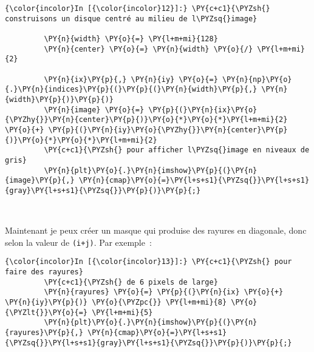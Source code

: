     \begin{Verbatim}[commandchars=\\\{\}]
{\color{incolor}In [{\color{incolor}12}]:} \PY{c+c1}{\PYZsh{} construisons un disque centré au milieu de l\PYZsq{}image}
         
         \PY{n}{width} \PY{o}{=} \PY{l+m+mi}{128}
         \PY{n}{center} \PY{o}{=} \PY{n}{width} \PY{o}{/} \PY{l+m+mi}{2}
         
         \PY{n}{ix}\PY{p}{,} \PY{n}{iy} \PY{o}{=} \PY{n}{np}\PY{o}{.}\PY{n}{indices}\PY{p}{(}\PY{p}{(}\PY{n}{width}\PY{p}{,} \PY{n}{width}\PY{p}{)}\PY{p}{)}
         \PY{n}{image} \PY{o}{=} \PY{p}{(}\PY{n}{ix}\PY{o}{\PYZhy{}}\PY{n}{center}\PY{p}{)}\PY{o}{*}\PY{o}{*}\PY{l+m+mi}{2} \PY{o}{+} \PY{p}{(}\PY{n}{iy}\PY{o}{\PYZhy{}}\PY{n}{center}\PY{p}{)}\PY{o}{*}\PY{o}{*}\PY{l+m+mi}{2}
         \PY{c+c1}{\PYZsh{} pour afficher l\PYZsq{}image en niveaux de gris}
         \PY{n}{plt}\PY{o}{.}\PY{n}{imshow}\PY{p}{(}\PY{n}{image}\PY{p}{,} \PY{n}{cmap}\PY{o}{=}\PY{l+s+s1}{\PYZsq{}}\PY{l+s+s1}{gray}\PY{l+s+s1}{\PYZsq{}}\PY{p}{)}\PY{p}{;}
\end{Verbatim}


    \begin{center}
    \end{center}
    { \hspace*{\fill} \\}
    
    Maintenant je peux créer un masque qui produise des rayures en
diagonale, donc selon la valeur de \texttt{(i+j)}. Par exemple~:

    \begin{Verbatim}[commandchars=\\\{\}]
{\color{incolor}In [{\color{incolor}13}]:} \PY{c+c1}{\PYZsh{} pour faire des rayures}
         \PY{c+c1}{\PYZsh{} de 6 pixels de large}
         \PY{n}{rayures} \PY{o}{=} \PY{p}{(}\PY{n}{ix} \PY{o}{+} \PY{n}{iy}\PY{p}{)} \PY{o}{\PYZpc{}} \PY{l+m+mi}{8} \PY{o}{\PYZlt{}}\PY{o}{=} \PY{l+m+mi}{5}
         \PY{n}{plt}\PY{o}{.}\PY{n}{imshow}\PY{p}{(}\PY{n}{rayures}\PY{p}{,} \PY{n}{cmap}\PY{o}{=}\PY{l+s+s1}{\PYZsq{}}\PY{l+s+s1}{gray}\PY{l+s+s1}{\PYZsq{}}\PY{p}{)}\PY{p}{;}
\end{Verbatim}


    \begin{center}
    \end{center}
    { \hspace*{\fill} \\}
    
